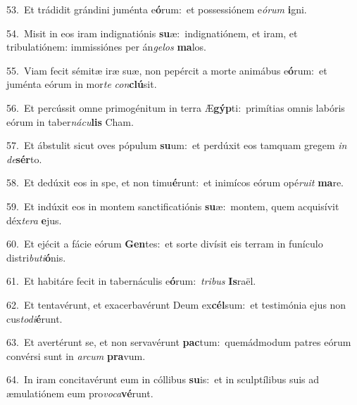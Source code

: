 {\numbfont\textcolor{\numbcolor}{53.}}~Et trádidit grándini juménta e\-\textbf{ó}\-rum:~\star et possessiónem e\-\textit{ó}\-\textit{rum} \textbf{i}\-gni.\par
{\numbfont\textcolor{\numbcolor}{54.}}~Misit in eos iram indignatiónis \textbf{su}\-æ:~\star indignatiónem, et iram, et tribulatiónem: immissiónes per án\-\textit{ge}\-\textit{los} \textbf{ma}\-los.\par
{\numbfont\textcolor{\numbcolor}{55.}}~Viam fecit sémitæ iræ suæ, non pepércit a morte animábus e\-\textbf{ó}\-rum:~\star et juménta eórum in mor\textit{te} \textit{con}\-\textbf{clú}sit.\par
{\numbfont\textcolor{\numbcolor}{56.}}~Et percússit omne primogénitum in terra Æ\-\textbf{gýp}\-ti:~\star primítias omnis labóris eórum in taber\-\textit{ná}\-\textit{cu}\textbf{lis} Cham.\par
{\numbfont\textcolor{\numbcolor}{57.}}~Et ábstulit sicut oves pópulum \textbf{su}\-um:~\star et perdúxit eos tamquam gregem \textit{in} \textit{de}\-\textbf{sér}to.\par
{\numbfont\textcolor{\numbcolor}{58.}}~Et dedúxit eos in spe, et non timu\-\textbf{é}\-runt:~\star et inimícos eórum opé\-\textit{ru}\-\textit{it} \textbf{ma}\-re.\par
{\numbfont\textcolor{\numbcolor}{59.}}~Et indúxit eos in montem sanctificatiónis \textbf{su}\-æ:~\star montem, quem acquisívit déx\-\textit{te}\-\textit{ra} \textbf{e}\-jus.\par
{\numbfont\textcolor{\numbcolor}{60.}}~Et ejécit a fácie eórum \textbf{Gen}\-tes:~\star et sorte divísit eis terram in funículo distri\-\textit{bu}\-\textit{ti}\textbf{ó}nis.\par
{\numbfont\textcolor{\numbcolor}{61.}}~Et habitáre fecit in tabernáculis e\-\textbf{ó}\-rum:~\star \textit{tri}\-\textit{bus} \textbf{Is}\-raël.\par
{\numbfont\textcolor{\numbcolor}{62.}}~Et tentavérunt, et exacerbavérunt Deum ex\-\textbf{cél}\-sum:~\star et testimónia ejus non cus\-\textit{to}\-\textit{di}\textbf{é}runt.\par
{\numbfont\textcolor{\numbcolor}{63.}}~Et avertérunt se, et non servavérunt \textbf{pac}\-tum:~\star quemádmodum patres eórum convérsi sunt in \textit{ar}\-\textit{cum} \textbf{pra}\-vum.\par
{\numbfont\textcolor{\numbcolor}{64.}}~In iram concitavérunt eum in cóllibus \textbf{su}\-is:~\star et in sculptílibus suis ad æmulatiónem eum pro\-\textit{vo}\-\textit{ca}\textbf{vé}runt.\par
